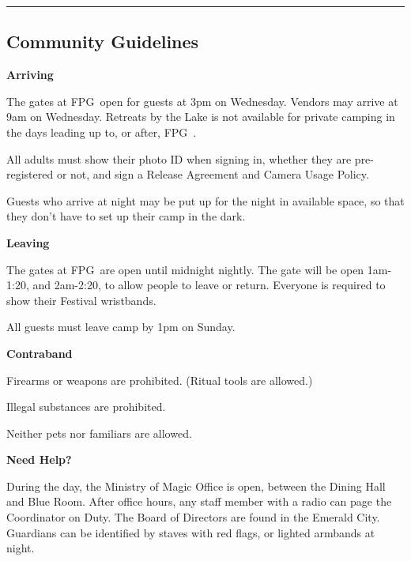 \documentclass[9pt,twoside,openright,final,article]{memoir}
\def\fpg{{\beltanefamily FPG\ }}
\let\oldsection=\section
\renewcommand{\section}[1]{%
  \vspace{3pt}%
  \needspace{1in}%
  { \hrule } \nopagebreak %
  \begin{center}\oldsection{#1}\end{center}\nopagebreak{}}
\renewcommand{\subsection}[1]{%
  \vspace{6pt}%
  \needspace{1.25in}%
  \begin{center}\textbf{\Large \beltanefamily #1}\end{center}

  \nopagebreak}
\begin{document}
\begin{multicols}{2}
  \section{Community Guidelines}

  \subsection{Arriving}

  The gates at \fpg open for guests at 3pm on Wednesday. Vendors may
  arrive at 9am on Wednesday.  Retreats by the Lake is not available
  for private camping in the days leading up to, or after, \fpg.

  All adults must show their photo ID when signing in, whether they
  are pre-registered or not, and sign a Release Agreement and Camera
  Usage Policy.

  Guests who arrive at night may be put up for the night in available
  space, so that they don't have to set up their camp in the dark.

  \subsection{Leaving}

  The gates at \fpg are open until midnight nightly. The gate will be
  open 1am-1:20, and 2am-2:20, to allow people to leave or
  return. Everyone is required to show their Festival wristbands.

  All guests must leave camp by 1pm on Sunday.

  \subsection{Contraband}

  Firearms or weapons are prohibited. (Ritual tools are allowed.)

  Illegal substances are prohibited.

  Neither pets nor familiars are allowed.

  \subsection{Need Help?}

  During the day, the Ministry of Magic Office is open, between the
  Dining Hall and Blue Room. After office hours, any staff member with
  a radio can page the Coordinator on Duty. The Board of Directors are
  found in the Emerald City. Guardians can be identified by staves
  with red flags, or lighted armbands at night.


\end{multicols}
\end{document}
